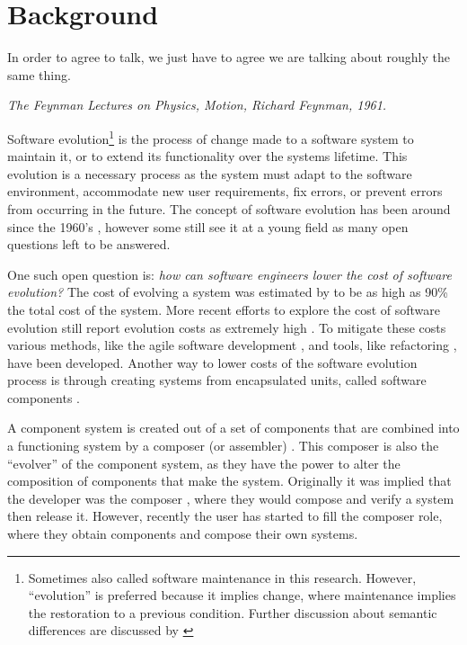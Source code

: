 \chapter{Background}
\label{background}
\epigraph{
In order to agree to talk, we just have to agree we are talking about roughly the same thing.
}
{\textit{The Feynman Lectures on Physics, Motion, Richard Feynman, 1961.}}

Software evolution\footnote{Sometimes also called software maintenance in this research. 
However, ``evolution'' is preferred because it implies change, where maintenance implies the restoration to a previous condition. 
Further discussion about semantic differences are discussed by \cite{Godfrey2008}} 
 \citep{lehman1980} is the process of change made to a software system to maintain it, or to extend its functionality over the systems lifetime.
This evolution is a necessary process as the system must adapt to the software environment, accommodate new user requirements, 
fix errors, or prevent errors from occurring in the future\citep{IsoIec2006}.
The concept of software evolution has been around since the 1960's \citep{Lehman1969}, 
however some still see it at a young field \citep{Godfrey2008} as many open questions left to be answered.

One such open question is: \textit{how can software engineers lower the cost of software evolution?}
The cost of evolving a system was estimated by \cite{Brooks1975} to be as high as 90\% the total cost of the system.
More recent efforts to explore the cost of software evolution still report evolution costs as extremely high \citep{Grubb2003}.
To mitigate these costs various methods, like the agile software development \citep{beck2001manifesto},
and tools, like refactoring \cite{fowler1999refactoring}, have been developed. 
Another way to lower costs of the software evolution process is through creating systems from encapsulated units, called software components \citep{Szyperski2002}.

A component system is created out of a set of components that are combined into a functioning system by a composer (or assembler) \citep{Szyperski2002}.
This composer is also the ``evolver'' of the component system, as they have the power to alter the composition of components that make the system.
Originally it was implied that the developer was the composer \citep{Parnas1972}, where they would compose and verify a system then release it.
However, recently the user has started to fill the composer role, where they obtain components and compose their own systems.


